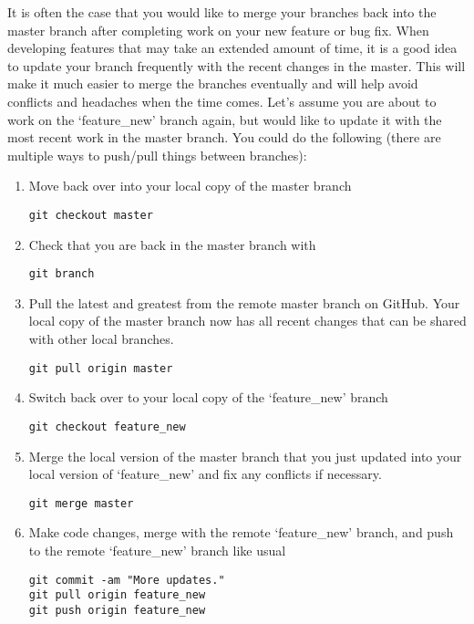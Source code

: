\documentclass[letter,10pt]{article}
\begin{document}
It is often the case that you would like to merge your branches back into the master branch after completing work on your new feature or bug fix. When developing features that may take an extended amount of time, it is a good idea to update your branch frequently with the recent changes in the master. This will make it much easier to merge the branches eventually and will help avoid conflicts and headaches when the time comes. Let's assume you are about to work on the `feature\_new' branch again, but would like to update it with the most recent work in the master branch. You could do the following (there are multiple ways to push/pull things between branches):

\begin{enumerate}

\item Move back over into your local copy of the master branch
\begin{verbatim}
git checkout master
\end{verbatim}

\item Check that you are back in the master branch with
\begin{verbatim}
git branch
\end{verbatim}

\item Pull the latest and greatest from the remote master branch on GitHub. Your local copy of the master branch now has all recent changes that can be shared with other local branches.
\begin{verbatim}
git pull origin master
\end{verbatim}

\item Switch back over to your local copy of the `feature\_new' branch
\begin{verbatim}
git checkout feature_new
\end{verbatim}

\item Merge the local version of the master branch that you just updated into your local version of `feature\_new' and fix any conflicts if necessary.
\begin{verbatim}
git merge master
\end{verbatim}

\item Make code changes, merge with the remote `feature\_new' branch, and push to the remote `feature\_new' branch like usual
\begin{verbatim}
git commit -am "More updates."
git pull origin feature_new
git push origin feature_new 
\end{verbatim}

\end{enumerate}
\end{document}

